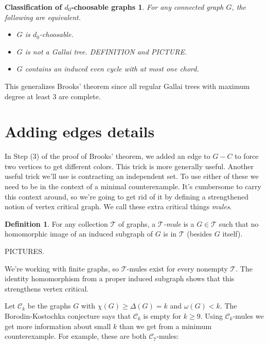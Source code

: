 \documentclass[12pt]{article}
\theoremstyle{plain}
\newtheorem*{ClassificationOfd0}{Classification of $d_0$-choosable graphs}
\theoremstyle{definition}
\newtheorem{defn}{Definition}
\theoremstyle{remark}
\newcommand{\fancy}[1]{\mathcal{#1}}
\begin{document}
\begin{ClassificationOfd0}
For any connected graph $G$, the following are equivalent.
\begin{itemize}
\item $G$ is $d_0$-choosable.
\item $G$ is not a Gallai tree.  DEFINITION and PICTURE.
\item $G$ contains an induced even cycle with at most one chord.
\end{itemize}
\end{ClassificationOfd0}

This generalizes Brooks' theorem since all regular Gallai trees with maximum degree at least $3$ are complete.

\section{Adding edges details}
In Step (3) of the proof of Brooks' theorem, we added an edge to $G-C$ to force two vertices to get different colors.  This trick is more generally useful.   Another useful trick we'll use is contracting an independent set. To use either of these we need to be in the context of a minimal counterexample.  It's cumbersome to carry this context around, so we're going to get rid of it by defining a strengthened notion of vertex critical graph.  We call these extra critical things \emph{mules}.

\begin{defn}
For any collection $\fancy{T}$ of graphs, a \emph{$\fancy{T}$-mule} is a $G \in \fancy{T}$ such that no homomorphic image of an induced subgraph of $G$ is in $\fancy{T}$ (besides $G$ itself).
\end{defn}

PICTURES.\bigskip

We're working with finite graphs, so $\fancy{T}$-mules exist for every nonempty $\fancy{T}$.  The identity homomorphism from a proper induced subgraph shows that this strengthens vertex critical. 

\bigskip

Let $\fancy{C}_k$ be the graphs $G$ with $\chi(G) \geq \Delta(G) = k$ and $\omega(G) < k$.  The Borodin-Kostochka conjecture says that $\fancy{C}_k$ is empty for $k \geq 9$. Using $\fancy{C}_k$-mules we get more information about small $k$ than we get from a minimum counterexample.  For example, these are both $\fancy{C}_7$-mules:



\end{document}
